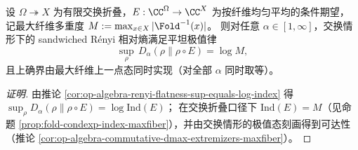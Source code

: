 \begin{conclusion}\label{con:xi-terminal-renyi-flatness-logM}
设 \(\Omega\twoheadrightarrow X\) 为有限交换折叠，\(E:\CC^\Omega\to \CC^X\) 为按纤维均匀平均的条件期望，
记最大纤维多重度 \(M:=\max_{x\in X}|\Fold^{-1}(x)|\)。
则对任意 \(\alpha\in[1,\infty]\)，交换情形下的 sandwiched Rényi 相对熵满足平坦极值律
\[
\sup_{\rho}\,D_\alpha(\rho\|\rho\circ E)=\log M,
\]
且上确界由最大纤维上一点态同时实现（对全部 \(\alpha\) 同时取等）。
\end{conclusion}
\begin{proof}[证明]
由推论 \ref{cor:op-algebra-renyi-flatness-sup-equals-log-index} 得 \(\sup_\rho D_\alpha(\rho\|\rho\circ E)=\log\mathrm{Ind}(E)\)；
在交换折叠口径下 \(\mathrm{Ind}(E)=M\)（见命题 \ref{prop:fold-condexp-index-maxfiber}），并由交换情形的极值态刻画得到可达性（推论 \ref{cor:op-algebra-commutative-dmax-extremizers-maxfiber}）。
\end{proof}

